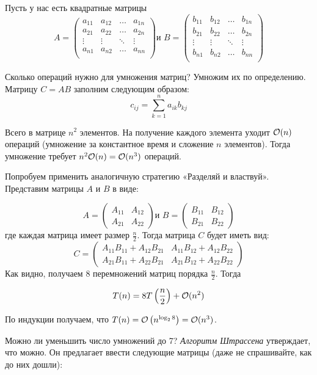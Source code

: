 Пусть у нас есть квадратные матрицы
\[A = \begin{pmatrix}
a_{11} & a_{12} & \ldots & a_{1n} \\
a_{21} & a_{22} & \ldots & a_{2n} \\
\vdots & \vdots & \ddots & \vdots \\
a_{n1} & a_{n2} & \ldots & a_{nn} \\
\end{pmatrix}
\text{и } 
B = \begin{pmatrix}
b_{11} & b_{12} & \ldots & b_{1n} \\
b_{21} & b_{22} & \ldots & b_{2n} \\
\vdots & \vdots & \ddots & \vdots \\
b_{n1} & b_{n2} & \ldots & b_{nn} \\
\end{pmatrix}\]

Сколько операций нужно для умножения матриц? Умножим их по определению. Матрицу
$C = AB$ заполним следующим образом:
\[c_{ij} = \sum\limits_{k = 1}^{n} a_{ik}b_{kj}\]

Всего в матрице $n^2$ элементов. На получение каждого элемента уходит $\mathcal{O}(n)$ 
операций (умножение за константное время и сложение $n$ элементов). Тогда 
умножение требует $n^2\mathcal{O}(n) = \mathcal{O}(n^3)$
операций.

Попробуем применить аналогичную стратегию «Разделяй и властвуй». Представим
матрицы $A$ и $B$ в виде:

\[A = \begin{pmatrix}
A_{11} & A_{12}\\
A_{21} & A_{22}
\end{pmatrix}
\text{и } 
B = \begin{pmatrix}
B_{11} & B_{12}\\
B_{21} & B_{22}
\end{pmatrix}\]
где каждая матрица имеет размер $\frac{n}{2}$. Тогда матрица $C$ будет иметь вид:
\[C = \begin{pmatrix}
A_{11}B_{11}+A_{12}B_{21} & A_{11}B_{12}+A_{12}B_{22}\\
A_{21}B_{11}+A_{22}B_{21} & A_{21}B_{12}+A_{22}B_{22}
\end{pmatrix}\]
 Как видно, получаем 8 перемножений матриц порядка $\frac{n}{2}$. Тогда

\[T(n) = 8T\left( \frac{n}{2} \right) + \mathcal{O}(n^2)\]

По индукции получаем, что $T(n) = \mathcal{O}\left(n^{\log_{2} 8}\right) = \mathcal{O}(n^{3})$.

Можно ли уменьшить число умножений до 7? \emph{Алгоритм Штрассена} утверждает,
что можно. Он предлагает ввести следующие матрицы (даже не спрашивайте, как до них дошли):

